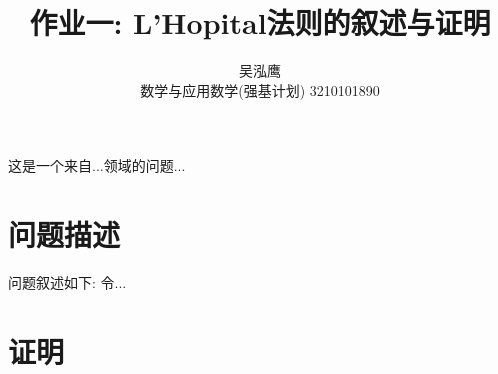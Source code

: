 \documentclass{ctexart}
\title{作业一: L'Hopital法则的叙述与证明}
\author{吴泓鹰 \\ 数学与应用数学(强基计划) 3210101890}
\begin{document}
\maketitle


这是一个来自...领域的问题...
\section{问题描述}
问题叙述如下: 令...

\section{证明}
\end{document}
